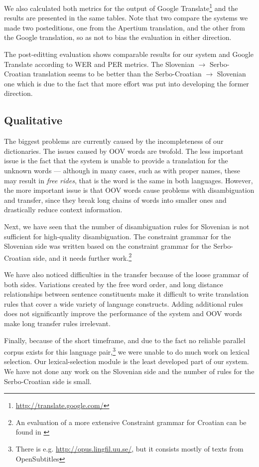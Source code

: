 We also calculated both metrics for the output of Google Translate\footnote{\url{http://translate.google.com/}} 
and the results are presented in the same tables. Note that two compare the systems
we made two posteditions, one from the Apertium translation, and the other 
from the Google translation, so as not to bias the evaluation in either direction.

The post-editting evaluation shows comparable results for our system
and Google Translate according to WER and PER metrics.  The Slovenian
$\rightarrow$ Serbo-Croatian translation seems to be better than the
Serbo-Croatian $\rightarrow$ Slovenian one which is due to the fact
that more effort was put into developing the former direction.



\subsection{Qualitative}
The biggest problems are currently caused by the incompleteness of our dictionaries.
The issues caused by OOV words are twofold.
The less important issue is the fact that the system is unable to provide a translation for the unknown words ---
although in many cases, such as with proper names, these may result in \emph{free rides}, that is the word
is the same in both languages.
However, the more important issue is that OOV words cause problems with disambiguation and transfer, since they
break long chains of words into smaller ones and drastically reduce context information. 

Next, we have seen that the number of disambiguation rules for
Slovenian is not sufficient for high-quality disambiguation.  The
constraint grammar for the Slovenian side was written based on the
constraint grammar for the Serbo-Croatian side, and it needs further
work.\footnote{An evaluation of a more extensive Constraint
  grammar for Croatian can be found in \cite{peradin2012towards}}

We have also noticed difficulties in the transfer because of the loose
grammar of both sides. Variations created by the free word order, and
long distance relationships between sentence constituents make it
difficult to write translation rules that cover a wide variety of
language constructs. Adding additional rules does not significantly
improve the performance of the system and OOV words make long transfer
rules irrelevant.

Finally, because of the short timeframe, and due to the fact no
reliable parallel corpus exists for this language pair,\footnote{There
is e.g. \url{http://opus.lingfil.uu.se/}, but it consists mostly of
texts from OpenSubtitles} we were unable to do much work on lexical selection.
Our lexical-selection module is the least developed part of our
system. We have not done any work on the Slovenian side and the number
of rules for the Serbo-Croatian side is small.
